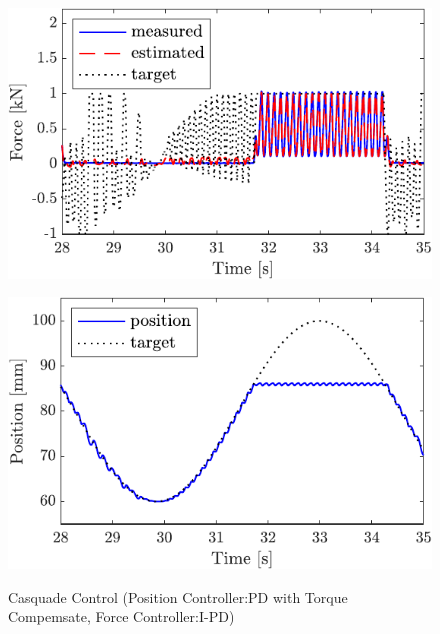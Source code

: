 \begin{figure}[t]
    \begin{minipage}{\minipageratio\hsize}
    \centering
        \includegraphics[keepaspectratio, scale = \minifigscale]{contents/IntegrationControl/figure/SECASQ/crop-FBcsqtch_IPD_trq_force.pdf}
        \label{fig5:crop-FBcsqtch_IPD_trq_force}
    \end{minipage}
    \begin{minipage}{\minipageratio\hsize}
    \centering
        \includegraphics[keepaspectratio, scale = \minifigscale]{contents/IntegrationControl/figure/SECASQ/crop-FBcsqtch_IPD_trq_pos.pdf}
        \label{fig5:crop-FBcsqtch_IPD_trq_pos}
    \end{minipage}
    \caption{Casquade Control (Position Controller:PD with Torque Compemsate, Force Controller:I-PD)}  
    \label{fig5:crop-FBcsqtch_IPD_trq}
\end{figure}

